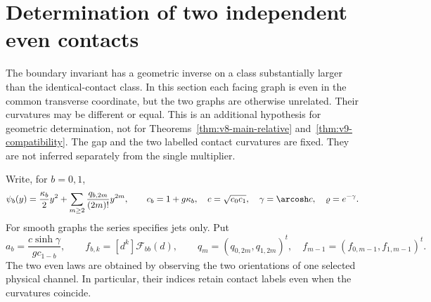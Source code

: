 \section{Determination of two independent even contacts}
\label{sec:v12-two-contact}
The boundary invariant has a geometric inverse on a class substantially
larger than the identical-contact class. In this section each facing
graph is even in the common transverse coordinate, but the two graphs
are otherwise unrelated. Their curvatures may be different or equal.
This is an additional hypothesis for geometric determination, not for
Theorems~\ref{thm:v8-main-relative} and~\ref{thm:v9-compatibility}.
The gap and the two labelled contact curvatures are fixed. They are not
inferred separately from the single multiplier.

Write, for $b=0,1$,
\begin{equation}\label{eq:v12-two-jets}
 \psi_b(y)=\frac{\kappa_b}2y^2+
       \sum_{m\ge2}\frac{q_{b,2m}}{(2m)!}y^{2m},\qquad
 c_b=1+g\kappa_b,\quad c=\sqrt{c_0c_1},\quad
 \gamma=\arcosh c,\quad \varrho=e^{-\gamma}.
\end{equation}
For smooth graphs the series specifies jets only. Put
\[
 a_b=\frac{c\sinh\gamma}{g c_{1-b}},\qquad
 f_{b,k}=[d^k]\mathcal F_{bb}(d),\qquad
 q_m=(q_{0,2m},q_{1,2m})^t,\quad
 f_{m-1}=(f_{0,m-1},f_{1,m-1})^t.
\]
The two even laws are obtained by observing the two orientations of
one selected physical channel. In particular, their indices retain
contact labels even when the curvatures coincide.

